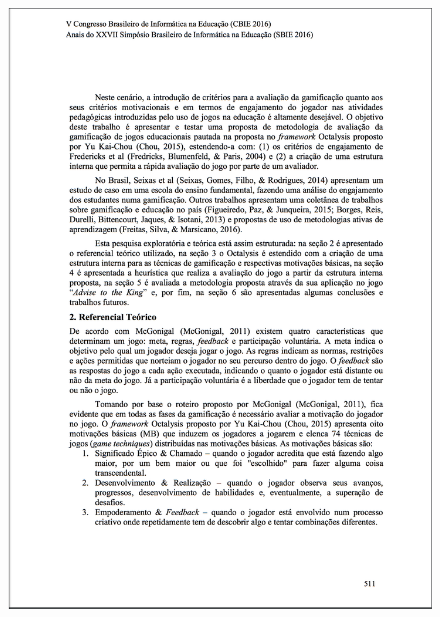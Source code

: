 \begin{apendicesenv}
\begin{figure}[h]
	\centering
		\includegraphics[keepaspectratio=true,scale=0.6]{figuras/a2.png}
\end{figure}


\end{apendicesenv}
